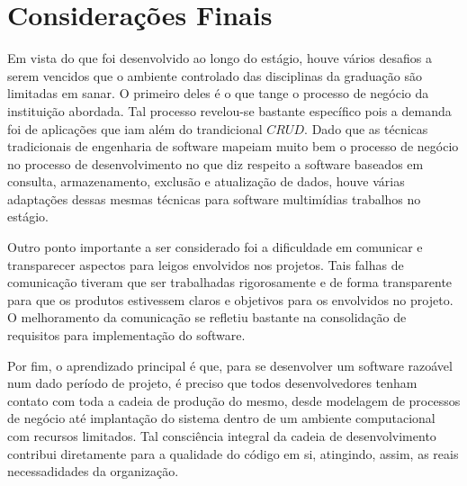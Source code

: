 \chapter{Considerações Finais}

Em vista do que foi desenvolvido ao longo do estágio, houve vários desafios a serem vencidos que o ambiente controlado das disciplinas da graduação são limitadas em sanar. O primeiro deles é o que tange o processo de negócio da instituição abordada. Tal processo revelou-se bastante específico pois a demanda foi de aplicações que iam além do trandicional $CRUD$. Dado que as técnicas tradicionais de engenharia de software mapeiam muito bem o processo de negócio no processo de desenvolvimento no que diz respeito a software baseados em consulta, armazenamento, exclusão e atualização de dados, houve várias adaptações dessas mesmas técnicas para software multimídias trabalhos no estágio.

Outro ponto importante a ser considerado foi a dificuldade em comunicar e transparecer aspectos para leigos envolvidos nos projetos. Tais falhas de comunicação tiveram que ser trabalhadas rigorosamente e de forma transparente para que os produtos estivessem claros e objetivos para os envolvidos no projeto. O melhoramento da comunicação se refletiu bastante na consolidação de requisitos para implementação do software.

Por fim, o aprendizado principal é que, para se desenvolver um software razoável num dado período de projeto, é preciso que todos desenvolvedores tenham contato com toda a cadeia de produção do mesmo, desde modelagem de processos de negócio até implantação do sistema dentro de um ambiente computacional com recursos limitados. Tal consciência integral da cadeia de desenvolvimento contribui diretamente para a qualidade do código em si, atingindo, assim, as reais necessadidades da organização.